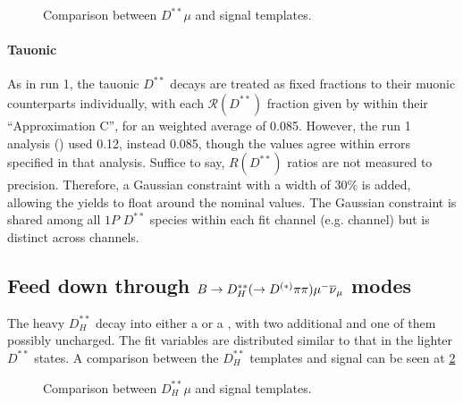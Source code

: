 \begin{figure}[!htb]

    \caption{Comparison between $D^{**}\mu$ and \Dz\taum signal templates.}
    \label{fig:dstst-mu-vs-d0-sig}
\end{figure}

\paragraph{Tauonic}
As in run 1, the tauonic $D^{**}$ decays are treated as fixed fractions
to their muonic counterparts individually, with each $\mathcal{R}(D^{**})$
fraction given by \cite{Bernlochner_2018} within their ``Approximation C'',
for an weighted average of 0.085.
However, the run 1 \RDst analysis (\cite{LHCb-ANA-2014-052}) used
0.12, instead 0.085,
though the values agree within errors specified in that analysis.
Suffice to say, $R(D^{**})$ ratios are not measured to precision.
Therefore, a Gaussian constraint with a width of 30\% is added,
allowing the yields to float around the nominal values.
The Gaussian constraint is shared among all $1P$ $D^{**}$ species within
each fit channel (e.g. \Dz channel) but is distinct across channels.


\subsection{Feed down through $B \rightarrow D_H^{**}(\rightarrow D^{(*)}\pi\pi){\mu^-}{{\overline{\nu}}_\mu}$ modes}

The heavy $D_H^{**}$ decay into either a \Dz or a \Dstar, with two additional
\pion and one of them possibly uncharged.
The fit variables are distributed similar to that in the lighter
$D^{**}$ states.
A comparison between the $D_H^{**}$ templates and \Dz\taum signal can be
seen at \ref{fig:dstst-heavy-vs-d0-sig}

\begin{figure}[!htb]

    \caption{Comparison between $D_H^{**}\mu$ and \Dz\taum signal templates.}
    \label{fig:dstst-heavy-vs-d0-sig}
\end{figure}


